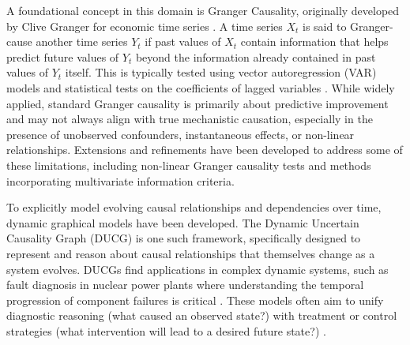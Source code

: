 {A foundational concept in this domain is Granger Causality, originally developed by Clive Granger for economic time series \cite{Granger1969Investigating, granger1980testing}. A time series $X_t$ is said to Granger-cause another time series $Y_t$ if past values of $X_t$ contain information that helps predict future values of $Y_t$ beyond the information already contained in past values of $Y_t$ itself. This is typically tested using vector autoregression (VAR) models and statistical tests on the coefficients of lagged variables \cite{geweke1982measurement, padav2021granger}. While widely applied, standard Granger causality is primarily about predictive improvement and may not always align with true mechanistic causation, especially in the presence of unobserved confounders, instantaneous effects, or non-linear relationships. Extensions and refinements have been developed to address some of these limitations, including non-linear Granger causality tests and methods incorporating multivariate information criteria.

To explicitly model evolving causal relationships and dependencies over time, dynamic graphical models have been developed. The Dynamic Uncertain Causality Graph (DUCG) \cite{Zhang2012Dynamic} is one such framework, specifically designed to represent and reason about causal relationships that themselves change as a system evolves. DUCGs find applications in complex dynamic systems, such as fault diagnosis in nuclear power plants where understanding the temporal progression of component failures is critical \cite{Deng2018Cubic, Hu2017Accident}. These models often aim to unify diagnostic reasoning (what caused an observed state?) with treatment or control strategies (what intervention will lead to a desired future state?) \cite{Deng2020Towards}.

}

